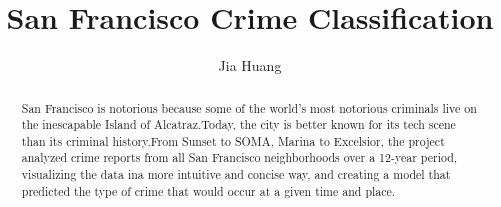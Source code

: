 \documentclass{amsart}
\begin{document}
%
%
\title[A Short Running Title]{ San Francisco Crime Classification}%

\author{Jia Huang}
\address[A.~1]{School of Computer Science,\\ 
Xi'an Shiyou University, Shaanxi 710065, China}%


%

\date{\gitAuthorDate}%

\begin{abstract}
    San Francisco is notorious because some of the world's most notorious
    criminals live on the inescapable Island of Alcatraz.Today, the city 
    is better known for its tech scene than its criminal history.From 
    Sunset to SOMA, Marina to Excelsior, the project analyzed crime reports 
    from all San Francisco neighborhoods over a 12-year period, visualizing 
    the data ina more intuitive and concise way, and creating a model 
    that predicted the type of crime that would occur at a given time
    and place.
\end{abstract}

\maketitle
\tableofcontents

\newpage



\newpage




\listoftodos
\end{document}
